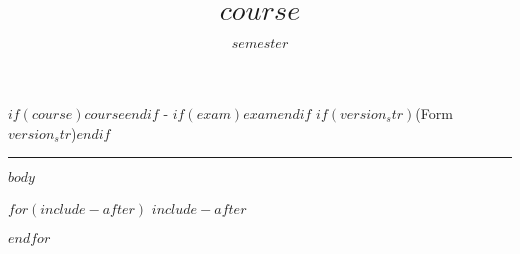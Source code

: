 \documentclass[12pt]{article}
\title{$course$}
\date{$semester$}
\begin{document}
\thispagestyle{firststyle}
\begin{center}
{\Large $if(course)$$course$$endif$ - $if(exam)$$exam$$endif$ $if(version_str)$(Form $version_str$)$endif$}\\[.5cm]
\end{center}
\hrule
\vspace{.5cm}

$body$



$for(include-after)$
$include-after$

$endfor$
\end{document}
